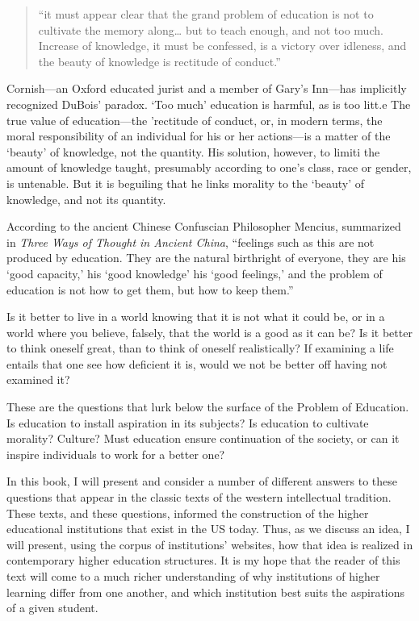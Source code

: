 \begin{quote}

``it must appear clear that the grand problem of education is not to cultivate the memory along{\ldots} but to teach enough, and not too much. Increase of knowledge, it must be confessed, is a victory over idleness, and the beauty of knowledge is rectitude of conduct.'' ~\citep[p. 9]{Cornish:1843wl}
\end{quote}

Cornish---an Oxford educated jurist and a member of Gary's Inn---has implicitly recognized DuBois' paradox. `Too much' education is harmful, as is too litt.e The true value of education---the 'rectitude of conduct, or, in modern terms, the moral responsibility of an individual for his or her actions---is a matter of the `beauty' of knowledge, not the quantity. His solution, however, to limiti the amount of knowledge taught, presumably according to one's class, race or gender, is untenable. But it is beguiling that he links morality to the `beauty' of knowledge, and not its quantity.

According to the ancient Chinese Confuscian Philosopher Mencius, summarized in \emph{Three Ways of Thought in Ancient China}, ``feelings such as this are not produced by education. They are the natural birthright of everyone, they are his `good capacity,' his `good knowledge' his `good feelings,' and the problem of education is not how to get them, but how to keep them.'' ~\citep[p. 83]{Waley:2005tl}

Is it better to live in a world knowing that it is not what it could be, or in a world where you believe, falsely, that the world is a good as it can be? Is it better to think oneself great, than to think of oneself realistically? If examining a life entails that one see how deficient it is, would we not be better off having not examined it?

These are the questions that lurk below the surface of the Problem of Education. Is education to install aspiration in its subjects? Is education to cultivate morality? Culture? Must education ensure continuation of the society, or can it inspire individuals to work for a better one?

In this book, I will present and consider a number of different answers to these questions that appear in the classic texts of the western intellectual tradition. These texts, and these questions, informed the construction of the higher educational institutions that exist in the US today. Thus, as we discuss an idea, I will present, using the corpus of institutions' websites, how that idea is realized in contemporary higher education structures. It is my hope that the reader of this text will come to a much richer understanding of why institutions of higher learning differ from one another, and which institution best suits the aspirations of a given student.

